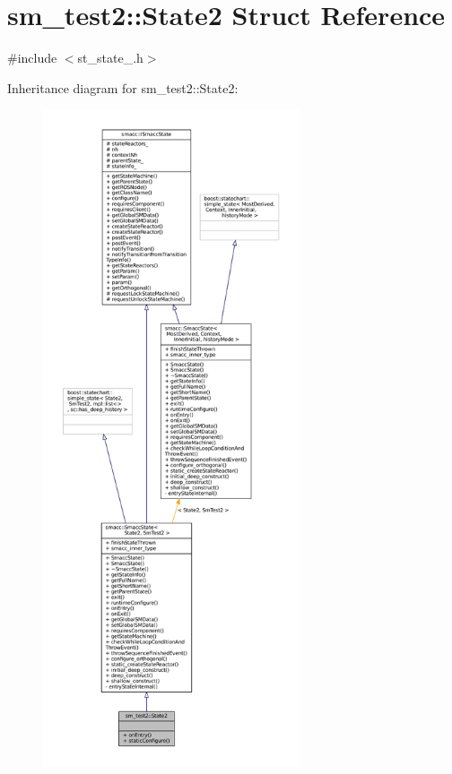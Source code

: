 \hypertarget{structsm__test2_1_1State2}{}\section{sm\+\_\+test2\+:\+:State2 Struct Reference}
\label{structsm__test2_1_1State2}


{\ttfamily \#include $<$st\+\_\+state\+\_.\+h$>$}



Inheritance diagram for sm\+\_\+test2\+:\+:State2\+:
\nopagebreak
\begin{figure}[H]
\begin{center}
\leavevmode
\includegraphics[height=550pt]{structsm__test2_1_1State2__inherit__graph}
\end{center}
\end{figure}


